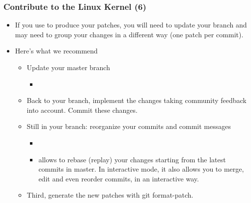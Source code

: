 \begin{frame}
  \frametitle{Contribute to the Linux Kernel (6)}
  \begin{itemize}
  \item If you use  to produce your patches,
    you will need to update your branch and may need to group your
    changes in a different way (one patch per commit).
  \item Here's what we recommend
    \begin{itemize}
    \item Update your master branch
      \begin{itemize}
      \item {}
      \end{itemize}
    \item Back to your branch, implement the changes taking community
      feedback into account. Commit these changes.
    \item Still in your branch: reorganize your commits and commit messages
      \begin{itemize}
      \item {}
      \item {} allows to rebase (replay) your changes
        starting from the latest commits in master. In interactive
        mode, it also allows you to merge, edit and even reorder
        commits, in an interactive way.
      \end{itemize}
    \item Third, generate the new patches with git format-patch.
    \end{itemize}
  \end{itemize}
\end{frame}

